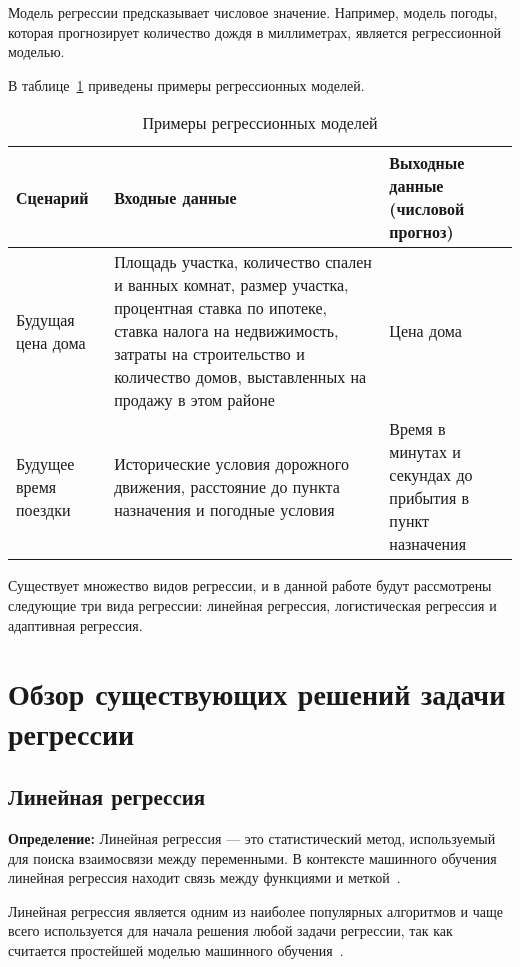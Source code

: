 Модель регрессии предсказывает числовое значение.
Например, модель погоды, которая прогнозирует количество дождя в миллиметрах, является регрессионной моделью.

В таблице~\ref{tab:tabl1} приведены примеры регрессионных моделей.

\begin{table}[ht]
    \centering
    \caption{Примеры регрессионных моделей}
    \begin{tabularx}{\textwidth}{|>{\centering\arraybackslash}X|>{\centering\arraybackslash}X|>{\centering\arraybackslash}X|}
        \hline
        Сценарий & Входные данные & Выходные данные \newline(числовой прогноз) \\
        \hline
        Будущая цена дома & Площадь участка, количество спален и ванных комнат, размер участка, процентная ставка по ипотеке, ставка налога на недвижимость, затраты на строительство и количество домов, выставленных на продажу в этом районе & Цена дома \\
        \hline
        Будущее время поездки & Исторические условия дорожного движения, расстояние до пункта назначения и погодные условия & Время в минутах и секундах до прибытия в пункт назначения \\
        \hline
    \end{tabularx}
    \label{tab:tabl1}
\end{table}

Существует множество видов регрессии, и в данной работе будут рассмотрены следующие три вида регрессии: линейная регрессия, логистическая регрессия и адаптивная регрессия.

\chapter{Обзор существующих решений задачи регрессии}
\section{Линейная регрессия}

\textbf{ Определение:} Линейная регрессия --- это статистический метод, используемый для поиска взаимосвязи между переменными.
В контексте машинного обучения линейная регрессия находит связь между функциями и меткой~\cite{google}.

Линейная регрессия является одним из наиболее популярных алгоритмов и чаще всего используется для начала решения любой задачи регрессии, так как считается простейшей моделью машинного обучения~\cite{kemer}.

